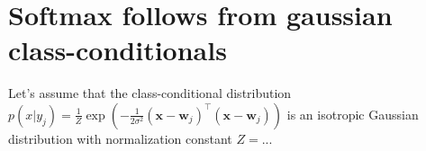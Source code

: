 \documentclass{esannV2}
\begin{document}
\begin{footnotesize}





\end{footnotesize}

\appendix
\section{Softmax follows from gaussian class-conditionals}
Let's assume that the class-conditional distribution $p(x|y_j) = \frac{1}{Z} \exp(-\frac{1}{2\sigma^2}(\mathbf{x} - \mathbf{w}_j)^{\top}(\mathbf{x} - \mathbf{w}_j))$ is an isotropic Gaussian distribution with normalization constant $Z = ..$. 
\end{document}
